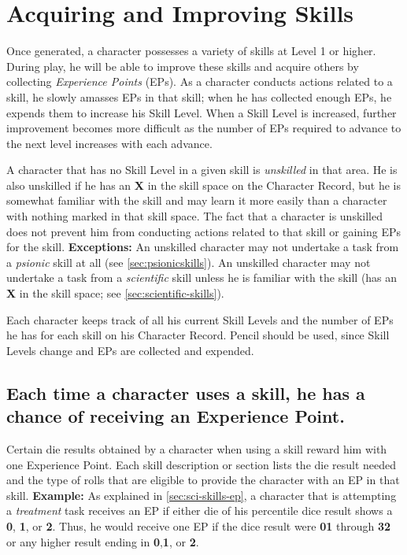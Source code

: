 \section{Acquiring and Improving Skills}
\label{sec:acqu-impr-skills}

Once generated, a character possesses a variety of skills at Level 1
or higher.  During play, he will be able to improve these skills and
acquire others by collecting \emph{Experience Points} (EPs).  As a character
conducts actions related to a skill, he slowly amasses EPs in that
skill; when he has collected enough EPs, he expends them to increase
his Skill Level.  When a Skill Level is increased, further improvement
becomes more difficult as the number of EPs required to advance to
the next level increases with each advance.

A character that has no Skill Level in a given skill is
\emph{unskilled} in that area.  He is also unskilled if he has an
\textbf{\textsf{X}} in the skill space on the Character Record, but he
is somewhat familiar with the skill and may learn it more easily than
a character with nothing marked in that skill space.  The fact that a
character is unskilled does not prevent him from conducting actions
related to that skill or gaining EPs for the skill.
\textbf{Exceptions:} An unskilled character may not undertake a task
from a \emph{psionic} skill at all (see \ref{sec:psionicskills}).  An
unskilled character may not undertake a task from a \emph{scientific}
skill unless he is familiar with the skill (has an \textbf{\textsf{X}}
in the skill space; see \ref{sec:scientific-skills}).

Each character keeps track of all his current Skill Levels and the
number of EPs he has for each skill on his Character Record.  Pencil
should be used, since Skill Levels change and EPs are collected and
expended.


\subsection[Experience Points]{Each time a character uses a skill, he
  has a chance of 
  receiving an Experience Point.}
\label{sec:experience-points}

Certain die results obtained by a character when using a skill reward
him with one Experience Point.  Each skill description or section lists
the die result needed and the type of rolls that are eligible to
provide the character with an EP in that skill.
\textbf{Example:} As explained in \ref{sec:sci-skills-ep}, a character
that is attempting a \emph{treatment} task receives an EP if either
die of his percentile dice result shows a \textbf{0}, \textbf{1}, or
\textbf{2}.  Thus, he would receive one EP if the dice result were
\textbf{01} through \textbf{32} or any higher result ending in
\textbf{0},\textbf{1}, or \textbf{2}.

